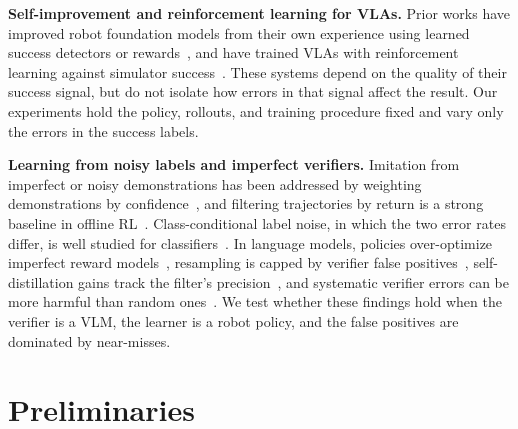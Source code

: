 \documentclass[letterpaper, journal, twoside]{IEEEtran}
\begin{document}
\textbf{Self-improvement and reinforcement learning for VLAs.} Prior works have improved robot foundation models from
their own experience using learned success detectors or rewards~\cite{sefm,pistar06}, and have trained VLAs with
reinforcement learning against simulator success~\cite{simplevlarl}. These systems depend on the quality of their
success signal, but do not isolate how errors in that signal affect the result. Our experiments hold the policy,
rollouts, and training procedure fixed and vary only the errors in the success labels.

\textbf{Learning from noisy labels and imperfect verifiers.} Imitation from imperfect or noisy demonstrations has
been addressed by weighting demonstrations by confidence~\cite{wu2019imperfect,sasaki2021noisy}, and filtering
trajectories by return is a strong baseline in offline RL~\cite{chen2021dt}. Class-conditional label noise, in which
the two error rates differ, is well studied for classifiers~\cite{natarajan2013noisy}. In language models, policies
over-optimize imperfect reward models~\cite{gao2023overopt}, resampling is capped by verifier false
positives~\cite{flaws}, self-distillation gains track the filter's precision~\cite{zhou2026verifier}, and systematic
verifier errors can be more harmful than random ones~\cite{egashira2026delay}. We test whether these findings hold
when the verifier is a VLM, the learner is a robot policy, and the false positives are dominated by near-misses.

\section{Preliminaries}
\end{document}
